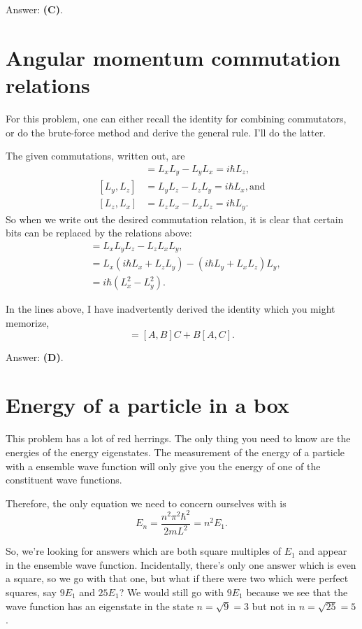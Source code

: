 \documentclass[11pt]{paper}
\newcommand{\answer}[1]{Answer: \textbf{(#1)}.}
\begin{document}
\answer{C}

\section{Angular momentum commutation relations}
For this problem, one can either recall the identity for combining commutators, or do the brute-force method and derive the general rule.  I'll do the latter.

The given commutations, written out, are
\begin{align}
[L_x,L_y] &= L_xL_y - L_yL_x = i\hbar L_z,\\
[L_y,L_z] &= L_yL_z - L_zL_y = i\hbar L_x, \text{and}\\
[L_z,L_x] &= L_zL_x - L_xL_z=  i\hbar L_y.
\end{align}
So when we write out the desired commutation relation, it is clear that certain bits can be replaced by the relations above:
\begin{align}
[L_x L_y, L_z] &= L_x L_y L_z - L_zL_xL_y,\\
&= L_x \left(i\hbar L_x + L_zL_y\right) - (i\hbar L_y + L_xL_z)L_y,\\
&= i\hbar \left(L_x^2 - L_y^2\right).
\end{align}

In the lines above, I have inadvertently derived the identity which you might memorize,
\begin{equation}
[AB,C] = [A,B]C + B[A,C].
\end{equation}

\answer{D}

\section{Energy of a particle in a box}
This problem has a lot of red herrings.  The only thing you need to know are the energies of the energy eigenstates.  The measurement of the energy of a particle with a ensemble wave function will only give you the energy of one of the constituent wave functions.

Therefore, the only equation we need to concern ourselves with is
\begin{equation}
E_n = \frac{n^2 \pi^2 \hbar^2}{2mL^2} = n^2 E_1.
\end{equation}

So, we're looking for answers which are both square multiples of $E_1$ and appear in the ensemble wave function.  Incidentally, there's only one answer which is even a square, so we go with that one, but what if there were two which were perfect squares, say $9E_1$ and $25E_1$?  We would still go with $9E_1$ because we see that the wave function has an eigenstate in the state $n=\sqrt{9}=3$ but not in $n=\sqrt{25}=5$.\\
\end{document}
